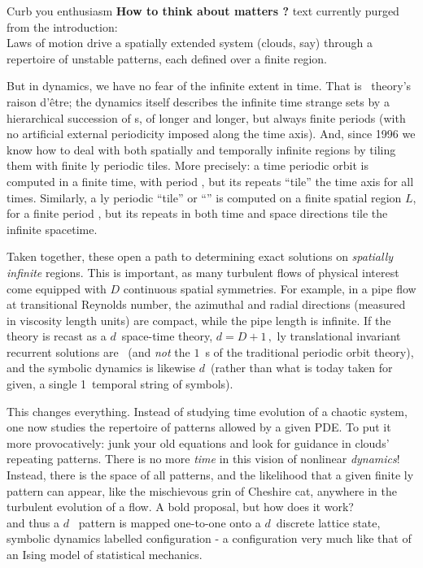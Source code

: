      {Curb you enthusiasm
{\bf How to think about matters {\spt}?}
text currently purged from the introduction:
\\

Laws of motion drive a spatially extended system (clouds, say) through a
repertoire of unstable patterns, each defined over a finite  {\spt}
region.

But in dynamics, we have no fear of the infinite extent in time. That is \po\
theory's raison d'\^{e}tre; the dynamics itself describes the
infinite time strange sets by a hierarchical succession of \po s, of longer
and longer, but always finite periods (with no artificial external
periodicity imposed along the time axis). And, since 1996 we know how to deal
with both spatially and temporally infinite regions by tiling them with
finite {\spt}ly periodic tiles\rf{Christiansen97,GHCW07}. More
precisely: a time periodic orbit is computed in a finite time, with period
\period{}, but its repeats ``tile'' the time axis for all times. Similarly, a
{\spt}ly periodic ``tile'' or ``\twot'' is computed on a finite
spatial region $L$, for a finite period \period{}, but its repeats in both
time and space directions tile the infinite spacetime.

Taken together, these open a path to determining exact solutions on
\emph{spatially infinite} regions.
This is important, as many turbulent flows of physical interest come equipped
with $D$ continuous spatial symmetries. For example, in a pipe flow at
transitional Reynolds number, the azimuthal and radial directions (measured
in viscosity length units) are compact, while the pipe length is infinite.
If the theory is recast as a $d$\dmn\ space-time theory,
\(d= D +1\,,\)
{\spt}ly translational invariant recurrent solutions are \dtors\
(and \emph{not} the $1$\dmn\ \po s of the traditional periodic orbit theory),
and the symbolic dynamics is likewise $d$\dmn\ (rather than what is
today taken for given, a single 1\dmn\ temporal string of symbols).

This changes everything. Instead of studying time evolution of a chaotic
system, one now studies the repertoire of {\spt} patterns allowed by
a given PDE.
To put it more provocatively: junk your old equations and look for guidance
in clouds' repeating patterns.
There is no more \emph{time} in this vision of nonlinear \emph{dynamics}!
Instead, there is the space of all {\spt} patterns, and the
likelihood that a given finite {\spt}ly pattern can appear, like the
mischievous grin of Cheshire cat, anywhere in the turbulent evolution of a flow.
A bold proposal, but how does it work?
\\

and thus a $d$\dmn\ {\spt} pattern is
mapped one-to-one onto a $d$\dmn\ discrete lattice state, symbolic
dynamics labelled configuration - a configuration very much like that of an
Ising model of statistical mechanics.
    } %




